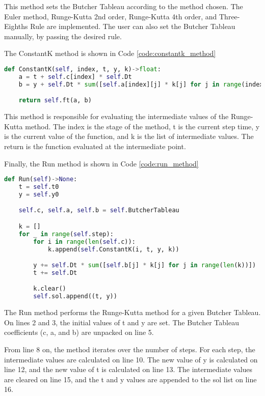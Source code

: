 This method sets the Butcher Tableau according to the method chosen. The Euler method, Runge-Kutta 2nd order, Runge-Kutta 4th order, and Three-Eighths Rule are implemented. The user can also set the Butcher Tableau manually, by passing the desired rule. 

The ConstantK method is shown in Code \ref{code:constantk_method}
\begin{lstlisting}[caption={ConstantK method},label={code:constantk_method},language=python]
def ConstantK(self, index, t, y, k)->float:
    a = t + self.c[index] * self.Dt
    b = y + self.Dt * sum([self.a[index][j] * k[j] for j in range(index)])

    return self.ft(a, b)
\end{lstlisting}

This method is responsible for evaluating the intermediate values of the Runge-Kutta method. The index is the stage of the method, t is the current step time, y is the current value of the function, and k is the list of intermediate values. The return is the function evaluated at the intermediate point.

Finally, the Run method is shown in Code \ref{code:run_method}
\begin{lstlisting}[caption={Run method},label={code:run_method},language=python]
def Run(self)->None:
    t = self.t0
    y = self.y0

    self.c, self.a, self.b = self.ButcherTableau

    k = []
    for _ in range(self.step):
        for i in range(len(self.c)):
            k.append(self.ConstantK(i, t, y, k))

        y += self.Dt * sum([self.b[j] * k[j] for j in range(len(k))])
        t += self.Dt

        k.clear()
        self.sol.append((t, y))
\end{lstlisting}

The Run method performs the Runge-Kutta method for a given Butcher Tableau. On lines 2 and 3, the initial values of t and y are set. The Butcher Tableau coefficients (c, a, and b) are unpacked on line 5. 

From line 8 on, the method iterates over the number of steps. For each step, the intermediate values are calculated on line 10. The new value of y is calculated on line 12, and the new value of t is calculated on line 13. The intermediate values are cleared on line 15, and the t and y values are appended to the sol list on line 16.

